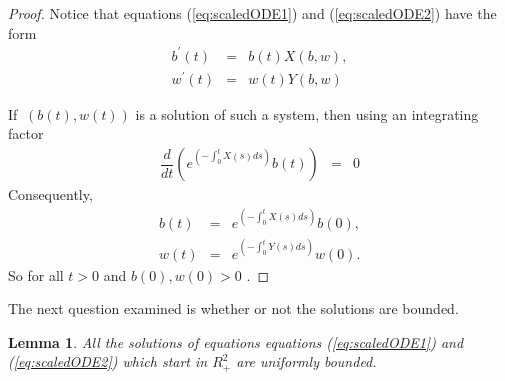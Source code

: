 \documentclass[12pt]{article}
\newtheorem{lemma}[theorem]{Lemma}
\begin{document}
\begin{proof}
  Notice that equations (\ref{eq:scaledODE1}) and
  (\ref{eq:scaledODE2}) have the form
\begin{eqnarray}
  b^{\prime}\left( t \right) & = & b(t)X\left( b,w\right), \\
  w^{\prime}\left( t \right) & = & w(t)Y\left( b,w\right)
\end{eqnarray}


If $\ \left( b\left( t\right) ,w\left( t\right) \right)
$ is a solution of such a system, then using an integrating factor
\begin{eqnarray}
\dfrac{d}{dt}\left( e^{\left( -\int_{0}^{t}X(s)ds\right) }b(t)\right) & = & 0
\end{eqnarray}
Consequently,
\begin{eqnarray}
b(t) & = & e^{\left( -\int_{0}^{t}X(s)ds\right) }b(0), \\
w(t) & = & e^{\left( -\int_{0}^{t}Y(s)ds\right) }w(0).
\end{eqnarray}
So for all $t>0$ and $b\left( 0\right) ,w\left( 0\right) >0$ .
\end{proof}

The next question examined is whether or not the solutions are
bounded.

\begin{lemma} \label{mm} All the solutions of equations equations
  (\ref{eq:scaledODE1}) and (\ref{eq:scaledODE2}) which start in
  $R_{+}^{2}$ are uniformly bounded.
\end{lemma}
\end{document}
